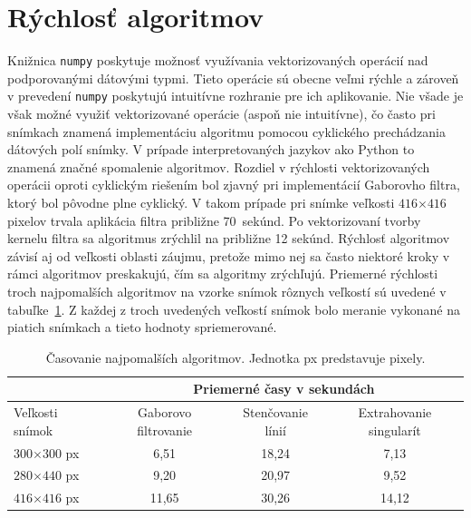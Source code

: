   \section{Rýchlosť algoritmov}
  Knižnica \texttt{numpy} poskytuje možnosť využívania vektorizovaných operácií nad podporovanými dátovými typmi. Tieto operácie sú obecne veľmi rýchle
  a zároveň v prevedení \texttt{numpy} poskytujú intuitívne rozhranie pre ich aplikovanie. Nie všade je však možné využiť vektorizované operácie
  (aspoň nie intuitívne), čo často pri snímkach znamená implementáciu algoritmu pomocou cyklického prechádzania dátových polí snímky. V prípade interpretovaných
  jazykov ako Python to znamená značné spomalenie algoritmov. Rozdiel v rýchlosti vektorizovaných operácii oproti cyklickým riešením bol zjavný pri
  implementácií Gaborovho filtra, ktorý bol pôvodne plne cyklický. V takom prípade pri snímke veľkosti $416$$\times{}$$416$ pixelov trvala aplikácia filtra približne
  70~sekúnd. Po vektorizovaní tvorby kernelu filtra sa algoritmus zrýchlil na približne 12 sekúnd. Rýchlosť algoritmov závisí aj od veľkosti oblasti záujmu,
  pretože mimo nej sa často niektoré kroky v rámci algoritmov preskakujú, čím sa algoritmy zrýchľujú. Priemerné rýchlosti troch najpomalších algoritmov
  na vzorke snímok rôznych veľkostí sú uvedené v tabuľke~{\ref{tab:casy_algo}}. Z každej z troch uvedených veľkostí snímok bolo meranie vykonané na piatich
  snímkach a tieto hodnoty spriemerované.
  \begin{table}[ht]
    \centering
    \caption{Časovanie najpomalších algoritmov. Jednotka px predstavuje pixely.}
    \begin{tabular}{ l|c|c|c| }
      \cline{2-4}
                        & \multicolumn{3}{|c|}{Priemerné časy v sekundách} \\
      \cline{2-4}
      \hline
      \multicolumn{1}{|l|}{Veľkosti snímok}   & Gaborovo filtrovanie & Stenčovanie línií & Extrahovanie singularít \\
      \hline
      \multicolumn{1}{|l|}{$300$$\times{}$$300$ px} & 6,51 & 18,24 & 7,13 \\
      \multicolumn{1}{|l|}{$280$$\times{}$$440$ px} & 9,20 & 20,97 & 9,52 \\
      \multicolumn{1}{|l|}{$416$$\times{}$$416$ px} & 11,65 & 30,26 & 14,12 \\
      \hline
    \end{tabular}
    \label{tab:casy_algo}
  \end{table}

